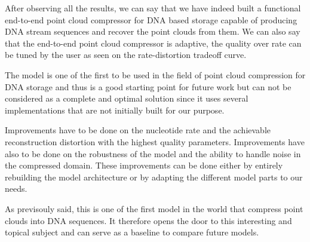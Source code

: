 
After observing all the results, we can say that we have indeed built a functional end-to-end point cloud compressor for DNA based storage capable of producing DNA stream sequences and recover the point clouds from them. 
We can also say that the end-to-end point cloud compressor is adaptive, the quality over rate can be tuned by the user as seen on the rate-distortion tradeoff curve. 

The model is one of the first to be used in the field of point cloud compression for DNA storage and thus is a good starting point for future work but can not be considered as a complete and optimal solution since it uses several implementations that are not initially built for our purpose.  

Improvements have to be done on the nucleotide rate and the achievable reconstruction distortion with the highest quality parameters. 
Improvements have also to be done on the robustness of the model and the ability to handle noise in the compressed domain.
These improvements can be done either by entirely rebuilding the model architecture or by adapting the different model parts to our needs.

As previsouly said, this is one of the first model in the world that compress point clouds into DNA sequences.
It therefore opens the door to this interesting and topical subject and can serve as a baseline to compare future models.
